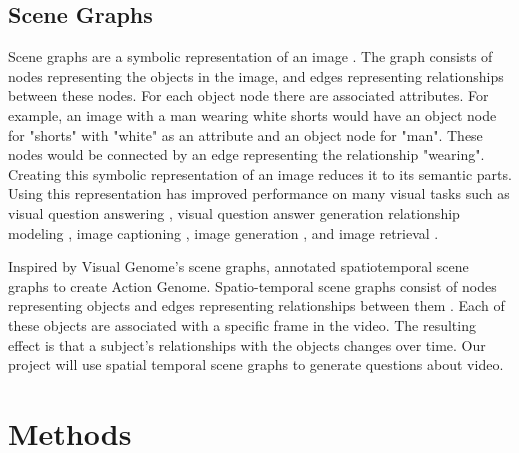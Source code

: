 \documentclass{article}
\newcommand{\mgm}[1]{{\color{cyan}{mgm: #1}}}
\begin{document}
\subsection{Scene Graphs}

Scene graphs are a symbolic representation of an image \cite{krishna2017visual}. The graph consists of nodes representing the objects in the image, and edges representing relationships between these nodes. For each object node there are associated attributes. For example, an image with a man wearing white shorts would have an object node for "shorts" with "white" as an attribute and an object node for "man". These nodes would be connected by an edge representing the relationship "wearing". Creating this symbolic representation of an image reduces it to its semantic parts. Using this representation has improved performance on many visual tasks such as visual question answering \cite{johnson2017inferring}, visual question answer generation \cite{hudson2019gqa} relationship modeling \cite{krishna2018referring}, image captioning \cite{anderson2016spice}, image generation \cite{johnson2018image, ashual2019specifying}, and image retrieval \cite{ashual2019specifying, johnson2015image}.

Inspired by Visual Genome's scene graphs, \cite{ji2020action} annotated spatiotemporal scene graphs to create Action Genome. Spatio-temporal scene graphs consist of nodes representing objects and edges representing relationships between them \mgm{(add in that these relationships are 3 categories?)}. Each of these objects are associated with a specific frame in the video. The resulting effect is that a subject's relationships with the objects changes over time. Our project will use spatial temporal scene graphs to generate questions about video. 

\section{Methods}
\end{document}
